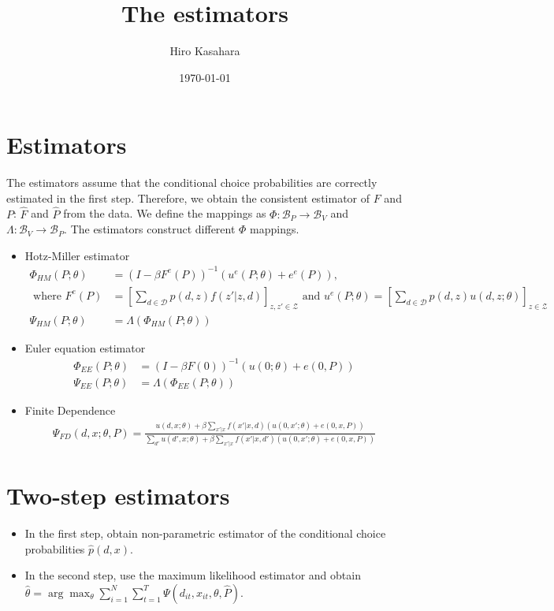 \documentclass{article}
\title{The estimators}
\author{Hiro Kasahara}
\date{\today}
\begin{document}
\maketitle
\section{Estimators}
The estimators assume that the conditional choice probabilities are correctly estimated in the first step.
Therefore, we obtain the consistent estimator of $F$ and $P$: $\hat{F}$ and $\hat{P}$ from the data.
We define the mappings as $\Phi : \mathcal{B}_{P} \to \mathcal{B}_{V}$ and $\Lambda: \mathcal{B}_{V} \to \mathcal{B}_{P}$.
The estimators construct different $\Phi$ mappings.
\begin{itemize}
  \item Hotz-Miller estimator \begin{equation}
  \begin{split}
          \Phi_{HM}(P;\theta) & = (I - \beta F^e(P))^{-1}( u^e(P;\theta) + e^e(P) ), \\
          \text{ where } F^e(P) & = \left[ \sum_{d \in \mathcal{D} } p(d,z) f(z'|z,d)\right]_{z,z' \in \mathcal{Z}}
          \text{ and } u^e(P;\theta)  = \left[ \sum_{d \in \mathcal{D} } p(d,z) u(d,z;\theta) \right]_{z \in \mathcal{Z}} \\
          \Psi_{HM}(P;\theta) & = \Lambda(\Phi_{HM}(P;\theta))
  \end{split}
  \end{equation}
  \item Euler equation estimator \begin{equation}
  \begin{split}
          \Phi_{EE}(P;\theta) & = (I - \beta F(0))^{-1}( u(0;\theta) + e(0,P))\\
          \Psi_{EE}(P;\theta) & = \Lambda(\Phi_{EE}(P;\theta))
  \end{split}
  \end{equation}
  \item Finite Dependence \[ \begin{split}
    \Psi_{FD}(d,x;\theta,P) = \frac{u(d,x;\theta) + \beta \sum_{x'|x}f(x'|x,d)(u(0,x';\theta) + e(0,x,P) ) }{ \sum_{d'} u(d',x;\theta) + \beta \sum_{x'|x}f(x'|x,d')(u(0,x';\theta) + e(0,x,P) )}
  \end{split} \]
\end{itemize}
\section{Two-step estimators}

\begin{itemize}
  \item In the first step, obtain non-parametric estimator of the conditional choice probabilities $\hat{p}(d,x)$.
  \item In the second step, use the maximum likelihood estimator and obtain $\hat{\theta} = \arg \max_{\theta} \sum_{i=1}^N \sum_{t=1}^T \Psi(d_{it},x_{it},\theta,\hat{P})$.
\end{itemize}
\end{document}
